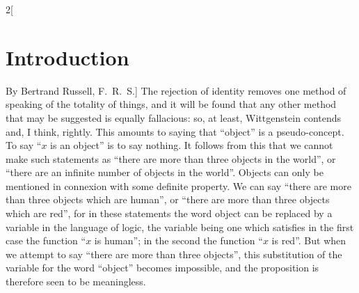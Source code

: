 \documentclass[oneside,openany,12pt]{book}
\begin{document}
\begin{multicols}{2}[\section*{Introduction}By Bertrand Russell, F.\ R.\ S.]
The rejection of identity removes one method of speaking of the totality of things, and it will be found that any other method that may be suggested is equally fallacious: so, at least, Wittgenstein contends and, I think, rightly. This amounts to saying that ``object'' is a pseudo-concept. To say ``$x$ is an object'' is to say nothing. It follows from this that we cannot make such statements as ``there are more than three objects in the world'', or ``there are an infinite number of objects in the world''. Objects can only be mentioned in connexion with some definite property. We can say ``there are more than three objects which are human'', or ``there are more than three objects which are red'', for in these statements the word object can be replaced by a variable in the language of logic, the variable being one which satisfies in the first case the function ``$x$ is human''; in the second the function ``$x$ is red''. But when we attempt to say ``there are more than three objects'', this substitution of the variable for the word ``object'' becomes impossible, and the proposition is therefore seen to be meaningless.


\end{multicols}
\end{document}
